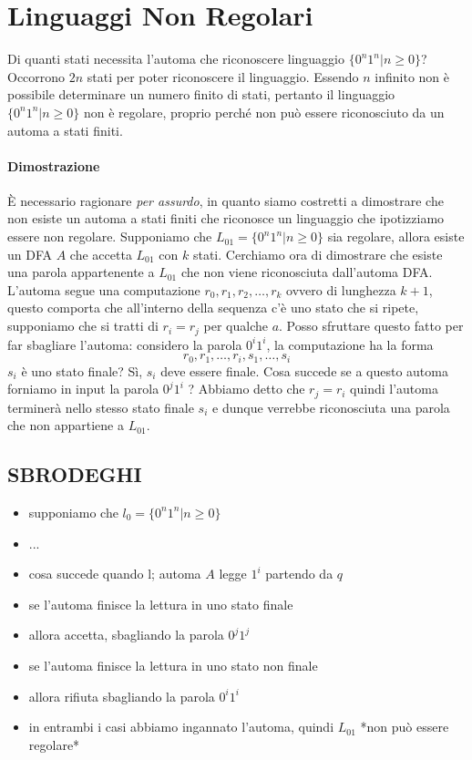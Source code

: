 \section{Linguaggi Non Regolari}
Di quanti stati necessita l'automa che riconoscere linguaggio $\{0^n1^n|n\geq0\}$?
Occorrono $2n$ stati per poter riconoscere il linguaggio. Essendo $n$ infinito non è possibile 
determinare un numero finito di stati, pertanto il linguaggio $\{0^n1^n|n\geq0\}$ non è regolare, 
proprio perché non può essere riconosciuto da un automa a stati finiti. 

\paragraph{Dimostrazione}

È necessario ragionare \textit{per assurdo}, in quanto siamo costretti a dimostrare che non esiste un automa 
a stati finiti che riconosce un linguaggio che ipotizziamo essere non regolare. 
Supponiamo che  $L_{01}=\{0^n1^n|n\geq0\}$ sia regolare, allora esiste un DFA $A$ che accetta $L_{01}$ con $k$ stati. 
Cerchiamo ora di dimostrare che esiste una parola appartenente a $L_{01}$ che non viene riconosciuta dall'automa DFA.
L'automa segue una computazione $r_0, r_1, r_2,\dots,r_k$ ovvero di lunghezza $k+1$, questo comporta che 
all'interno della sequenza c'è uno stato che si ripete, supponiamo che si tratti di  $r_i =r_j$ per qualche $a$.
Posso sfruttare questo fatto per far sbagliare l'automa:
considero la parola $0^i1^i$, la computazione ha la forma $$r_0, r_1, \dots, r_i, s_1, \dots, s_i$$
$s_i$ è uno stato finale? Sì, $s_i$ deve essere finale. 
Cosa succede se a questo automa forniamo in input la parola $0^j1^i$ ? 
Abbiamo detto che $r_j=r_i$ quindi l'automa terminerà nello stesso stato finale $s_i$ e 
dunque verrebbe riconosciuta una parola che non appartiene a $L_{01}$.

\subsection{SBRODEGHI}
\begin{itemize}
	\item supponiamo che $l_{0}=\{0^n1^n | n \geq 0\}$ 
	\item ...

	\item cosa succede quando l; automa $A$ legge $1^i$ partendo da $q$ 
	\item se l'automa finisce la lettura in uno stato finale
		\item allora accetta, sbagliando la parola $0^j1^j$ 
	\item se l'automa finisce la lettura in uno stato non finale
		\item allora rifiuta sbagliando la parola $0^i1^i$ 
	\item in entrambi i casi abbiamo ingannato l'automa, quindi $L_{01}$ *non può essere regolare*
\end{itemize}


